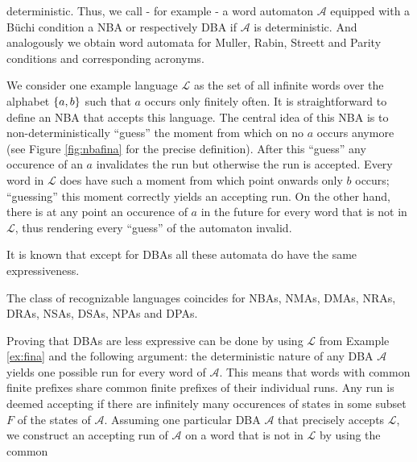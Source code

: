 deterministic. Thus, we call - for example - a word automaton $\mathcal{A}$
equipped with a Büchi condition a \ac{NBA} or respectively \ac{DBA} if
$\mathcal{A}$ is deterministic. And analogously we obtain word automata for
Muller, Rabin, Streett and Parity conditions and corresponding acronyms.
\begin{example}
  We consider one example language $\mathcal{L}$ as the set of all infinite
  words over the alphabet $\left\{a,b\right\}$ such that $a$ occurs only finitely often.
  It is straightforward to define an \ac{NBA} that accepts this language. The
  central idea of this \ac{NBA} is to non-deterministically \enquote{guess} the
  moment from which on no $a$ occurs anymore (see Figure \ref{fig:nbafina} for
  the precise definition). After this \enquote{guess} any occurence of an $a$
  invalidates the run but otherwise the run is accepted. Every word in
  $\mathcal{L}$ does have such a moment from which point onwards only $b$
  occurs; \enquote{guessing} this moment correctly yields an accepting run.
  On the other hand, there is at any point an occurence of $a$ in the future
  for every word that is not in $\mathcal{L}$, thus rendering every
  \enquote{guess} of the automaton invalid.
  \label{ex:fina}
\end{example}
It is known that except for \acp{DBA} all these automata do have the same
expressiveness.
\begin{theorem}
  \cite[Proposition 5.3, Theorem 5.4, Proposition 5.6]{LangAutoLog}
  The class of recognizable languages coincides for \acp{NBA}, \acp{NMA},
  \acp{DMA}, \acp{NRA}, \acp{DRA}, \acp{NSA}, \acp{DSA}, \acp{NPA} and
  \acp{DPA}.
\end{theorem}
Proving that \acp{DBA} are less expressive can be done by using
$\mathcal{L}$ from Example \ref{ex:fina} and the following argument: the
deterministic nature of any \ac{DBA} $\mathcal{A}$ yields one possible run for
every word of $\mathcal{A}$. This means that words with common finite prefixes
share common finite prefixes of their individual runs. Any run is deemed
accepting if there are infinitely many occurences of states in some subset $F$
of the states of $\mathcal{A}$. Assuming one particular \ac{DBA} $\mathcal{A}$
that precisely accepts $\mathcal{L}$, we construct an accepting run of
$\mathcal{A}$ on a word that is not in $\mathcal{L}$ by using the common
